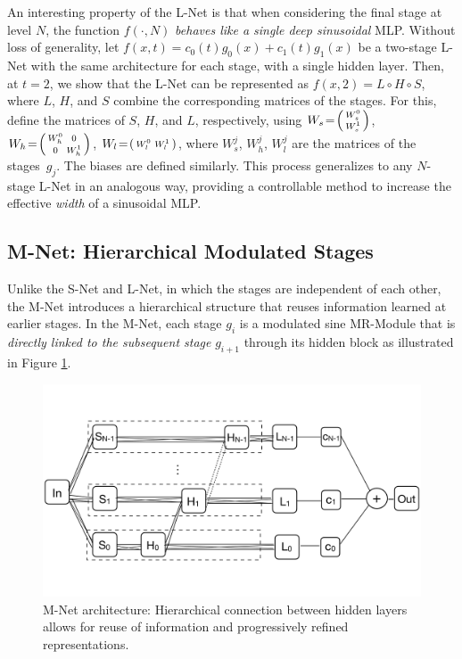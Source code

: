 An interesting property of the L-Net is that when considering the final stage at level \( N \), the function \( f(\cdot, N) \) \textit{behaves like a single deep sinusoidal} MLP. Without loss of generality, let \( f(x, t) = c_0(t)g_0(x) + c_1(t)g_1(x) \) be a two-stage L-Net with the same architecture for each stage, with a single hidden layer. Then, at \( t = 2 \), we show that the L-Net can be represented as \( f(x, 2) = L \circ H \circ S \), where \( L \), \( H \), and \( S \) combine the corresponding matrices of the stages. For this, define the matrices of $S$, $H$, and $L$, respectively, using $W_s\!=\!\begin{psmallmatrix}W_s^0\\W_s^1\end{psmallmatrix}$, 
$W_h\!=\!\begin{psmallmatrix}W_h^0& 0\\0&W_h^1\end{psmallmatrix}$, 
$W_l\!=\!\begin{psmallmatrix}W_l^0 & W_l^1\end{psmallmatrix}$, where $W_s^j$, $W_h^j$, $W_l^j$ are the matrices of the stages~$g_j$. The biases are defined similarly. This process generalizes to any \( N \)-stage L-Net in an analogous way, providing a controllable method to increase the effective \textit{width} of a sinusoidal MLP.

\subsection{M-Net: Hierarchical Modulated Stages}
\label{s-mnet}

Unlike the S-Net and L-Net, in which the stages are independent of each other, the M-Net introduces a hierarchical structure that reuses information learned at earlier stages. In the M-Net, each stage \( g_i \) is a modulated sine MR-Module that is \textit{directly linked to the subsequent stage} \( g_{i+1} \) through its hidden block as illustrated in Figure \ref{f:m-net}.

\begin{figure}[!h]
    \centering
    \includegraphics[width=0.75\linewidth]{img/ch4/mnet.pdf}
    \caption{M-Net architecture: Hierarchical connection between hidden layers allows for reuse of information and progressively refined representations.}
    \label{f:m-net}
\end{figure}
    
